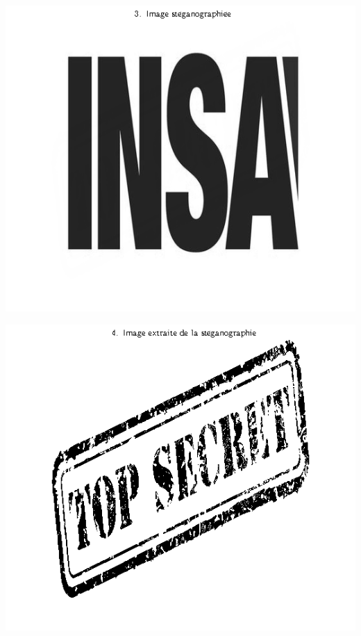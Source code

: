 \begin{minipage}{.5\textwidth}\centering
	\includegraphics[scale=0.4]{images/fig3.png}
	\label{fig3}
\end{minipage}
\begin{minipage}{.5\textwidth}\centering
	\includegraphics[scale=0.4]{images/fig4.png}
	\label{fig4}
\end{minipage}


